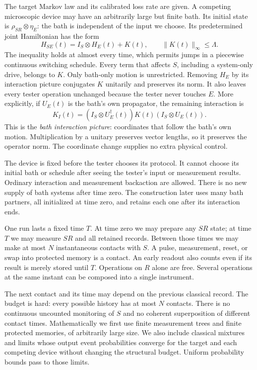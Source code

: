 \documentclass[11pt,a4paper]{article}
\numberwithin{equation}{section}
\theoremstyle{remark}
\begin{document}
The target Markov law and its calibrated loss rate are given. A competing
microscopic device may have an arbitrarily large but finite bath. Its initial
state is $\rho_{SR}\otimes\eta_E$: the bath is independent of the input we
choose. Its predetermined joint Hamiltonian has the form
\begin{equation}
 H_{SE}(t)=I_S\otimes H_E(t)+K(t),
 \qquad \|K(t)\|_\infty\le\Lambda.
 \label{eq:complete-strength}
\end{equation}
The inequality holds at almost every time, which permits jumps in a
piecewise continuous switching schedule. Every term that affects $S$,
including a system-only drive, belongs to $K$. Only bath-only motion is
unrestricted. Removing $H_E$ by its interaction picture conjugates $K$
unitarily and preserves its norm. It also leaves every tester operation
unchanged because the tester never touches $E$. More explicitly, if
$U_E(t)$ is the bath's own propagator, the remaining interaction is
\begin{equation}
 K_I(t)=(I_S\otimes U_E^\dagger(t))K(t)(I_S\otimes U_E(t)).
\end{equation}
This is the \emph{bath interaction picture}: coordinates that follow the
bath's own motion. Multiplication by a unitary preserves vector lengths,
so it preserves the operator norm. The coordinate change supplies no
extra physical control.

The device is fixed before the tester chooses its protocol. It cannot
choose its initial bath or schedule after seeing the tester's input or
measurement results. Ordinary interaction and measurement backaction are
allowed. There is no new supply of bath systems after time zero. The
construction later uses many bath partners, all initialized at time zero,
and retains each one after its interaction ends.

One run lasts a fixed time $T$. At time zero we may prepare any $SR$ state;
at time $T$ we may measure $SR$ and all retained records. Between those
times we may make at most $N$ instantaneous contacts with $S$. A pulse,
measurement, reset, or swap into protected memory is a contact. An early
readout also counts even if its result is merely stored until $T$.
Operations on $R$ alone are free. Several operations at the same instant
can be composed into a single instrument.

The next contact and its time may depend on the previous classical record.
The budget is hard: every possible history has at most $N$ contacts.
There is no continuous uncounted monitoring of $S$ and no coherent
superposition of different contact times. Mathematically we first use
finite measurement trees and finite protected memories, of arbitrarily
large size. We also include classical mixtures and limits whose output
event probabilities converge for the target and each competing device
without changing the structural budget. Uniform probability bounds pass
to those limits.
\end{document}
